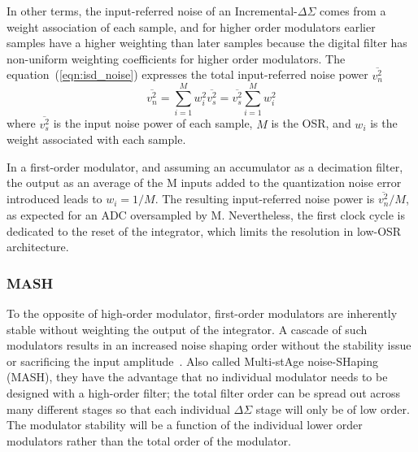 
In other terms, the input-referred noise of an Incremental-\(\Delta\Sigma \) comes from a weight association of each sample, and for higher order modulators earlier samples have a higher weighting than later samples because the digital filter has non-uniform weighting coefficients for higher order modulators. The equation~(\ref{eqn:isd_noise}) expresses the total input-referred noise power \(\overline{v_{n}^{2}}\)
\begin{equation}
	\overline{v_{n}^{2}}=\sum_{i=1}^{M}w_{i}^{2}\overline{v_{s}^{2}}=\overline{v_{s}^{2}}\sum_{i=1}^{M}w_{i}^{2}
\label{eqn:isd_noise}
\end{equation}
where \(\overline{v_{s}^{2}}\) is the input noise power of each sample, \(M\) is the OSR, and \(w_i\) is the weight associated with each sample.

In a first-order modulator, and assuming an accumulator as a decimation filter, the output as an average of the M inputs added to the quantization noise error introduced leads to \(w_i=1/M\). The resulting input-referred noise power is \(\overline{v_{n}^{2}}/M\), as expected for an ADC oversampled by M. Nevertheless, the first clock cycle is dedicated to the reset of the integrator, which limits the resolution in low-OSR architecture.

\subsubsection{MASH}
To the opposite of high-order modulator, first-order modulators are inherently stable without weighting the output of the integrator. A cascade of such modulators results in an increased noise shaping order without the stability issue or sacrificing the input amplitude~\cite{Brooks1997}. Also called Multi-stAge noise-SHaping (MASH), they have the advantage that no individual modulator needs to be designed with a high-order filter; the total filter order can be spread out across many different stages so that each individual \(\Delta\Sigma \) stage will only be of low order. The modulator stability will be a function of the individual lower order modulators rather than the total order of the modulator.

